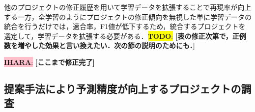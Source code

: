 \documentclass[submit]{ipsj}
\newcommand{\todo}[1]{\colorbox{yellow}{{\bf TODO}:}{\color{red} {\textbf{[#1]}}}}
\newcommand{\ihara}[1]{\colorbox{pink}{{\bf IHARA}:}{\color{blue} {\textbf{[#1]}}}}
\begin{document}


\begin{screen}
他のプロジェクトの修正履歴を用いて学習データを拡張することで再現率が向上する一方，全学習のようにプロジェクトの修正傾向を無視した単に学習データの統合を行うだけでは，適合率，F1値が低下するため，統合するプロジェクトを選定して，学習データを拡張する必要がある．\todo{表の修正次第で，正例数を増やした効果と言い換えたい．次の節の説明のためにも．}


\end{screen}

\ihara{ここまで修正完了}

\subsection{提案手法により予測精度が向上するプロジェクトの調査}
\end{document}
